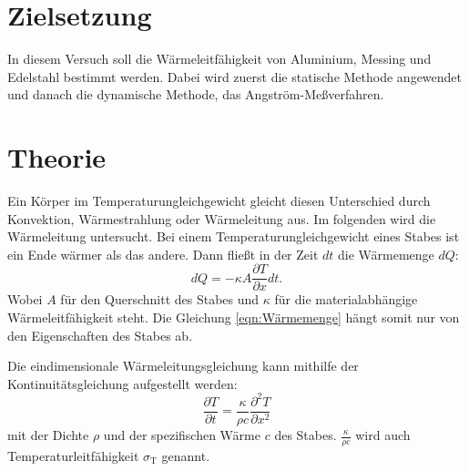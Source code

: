 \section{Zielsetzung}
\label{Zielsetzung}
In diesem Versuch soll die Wärmeleitfähigkeit von Aluminium, Messing und Edelstahl bestimmt werden.
Dabei wird zuerst die statische Methode angewendet und danach die dynamische Methode, das Angström-Meßverfahren.

\section{Theorie}
\label{Theorie}
Ein Körper im Temperaturungleichgewicht gleicht diesen Unterschied durch Konvektion, Wärmestrahlung oder Wärmeleitung aus.
Im folgenden wird die Wärmeleitung untersucht.
Bei einem Temperaturungleichgewicht eines Stabes ist ein Ende wärmer als das andere.
Dann fließt in der Zeit $dt$ die Wärmemenge $dQ$:
\begin{equation}\label{eqn:Wärmemenge}
    dQ = -\kappa A \frac{\partial T}{\partial x}dt .
\end{equation}
Wobei $A$ für den Querschnitt des Stabes und $\kappa$ für die materialabhängige Wärmeleitfähigkeit steht.
Die Gleichung \eqref{eqn:Wärmemenge} hängt somit nur von den Eigenschaften des Stabes ab.

Die eindimensionale Wärmeleitungsgleichung kann mithilfe der Kontinuitätsgleichung aufgestellt werden:
\begin{equation}
    \frac{\partial T}{\partial t} = \frac{\kappa}{\rho c} \frac{\partial^2 T}{\partial x^2}
\end{equation}
mit der Dichte $\rho$ und der spezifischen Wärme $c$ des Stabes.
$\frac{\kappa}{\rho c}$ wird auch Temperaturleitfähigkeit $\sigma_\text{T}$ genannt.

